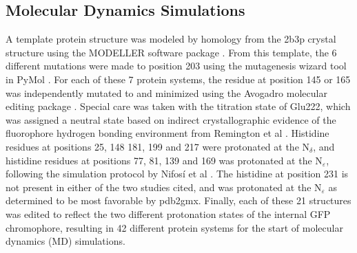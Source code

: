 \subsection{Molecular Dynamics Simulations}

A template protein structure was modeled by homology from the 2b3p crystal structure\cite{Pedelacq2006} using the MODELLER software package \cite{Marti-Renom2000}.
From this template, the 6 different mutations were made to position 203 using the mutagenesis wizard tool in PyMol \cite{DeLano2002}.
For each of these 7 protein systems, the residue at position 145 or 165 was independently mutated to \pCNF{} and minimized using the Avogadro molecular editing package \cite{Hanwell2012}. 
Special care was taken with the titration state of Glu222, which was assigned a neutral state based on indirect crystallographic evidence of the fluorophore hydrogen bonding environment from Remington et al \cite{Elsliger1999}. 
Histidine residues at positions 25, 148 181, 199 and 217 were protonated at the N$_{\delta}$, and histidine residues at positions 77, 81, 139 and 169 was protonated at the N$_{\varepsilon}$, following the simulation protocol by Nifos\'i et al \cite{Nifosi2003}.
The histidine at position 231 is not present in either of the two studies cited, and was protonated at the N$_{\varepsilon}$ as determined to be most favorable by pdb2gmx. 
Finally, each of these 21 structures was edited to reflect the two different protonation states of the internal GFP chromophore, resulting in 42 different protein systems for the start of molecular dynamics (MD) simulations. 

